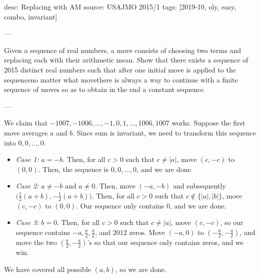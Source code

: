 desc: Replacing with AM
source: USAJMO 2015/1
tags: [2019-10, oly, easy, combo, invariant]

---

Given a sequence of real numbers, a move consists of choosing two terms and replacing each with their arithmetic mean. Show that there exists a sequence of 2015 distinct real numbers such that after one initial move is applied to the sequence\textemdash no matter what move\textemdash there is always a way to continue with a finite sequence of moves so as to obtain in the end a constant sequence.

---

We claim that $-1007,-1006,\ldots,-1,0,1,\ldots,1006,1007$ works. Suppose the first move averages $a$ and $b$. Since sum is invariant, we need to transform this sequence into $0,0,\ldots,0$.
\begin{itemize}
    \item \textit{Case 1:} $a=-b$. Then, for all $c>0$ such that $c\ne |a|$, move $(c,-c)$ to $(0,0)$. Then, the sequence is $0,0,\ldots,0$, and we are done.
    \item \textit{Case 2:} $a\ne -b$ and $a\ne 0$. Then, move $(-a,-b)$ and subsequently $\big(\tfrac12(a+b),-\tfrac12(a+b)\big)$. Then, for all $c>0$ such that $c\notin\{|a|,|b|\}$, move $(c,-c)$ to $(0,0)$. Our sequence only contains $0$, and we are done.
    \item \textit{Case 3:} $b=0$. Then, for all $c>0$ such that $c\ne |a|$, move $(c,-c)$, so our sequence contains $-a,\tfrac a2,\tfrac a2$, and $2012$ zeros. Move $(-a,0)$ to $(-\tfrac a2,-\tfrac a2)$, and move the two $(\tfrac a2,-\tfrac a2)$'s so that our sequence only contains zeros, and we win.
\end{itemize}
We have covered all possible $(a,b)$, so we are done.
